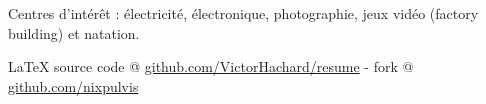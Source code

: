 \documentclass[10pt,a4paper]{article}
\newcommand{\latex}{\LaTeX\xspace}
\newenvironment{indentsection}[1]
{\begin{list}{}
  {\setlength{\leftmargin}{#1}} \item[]
}
{\end{list}}
\begin{document}
\begin{indentsection}{\parindent}
\begin{description*}
\item[Centres d'intérêt :]
  électricité, électronique, photographie, jeux vidéo (factory building) et natation.
\end{description*}
\end{indentsection}


\begin{center}
\footnotesize \latex source code @
\href{http://www.github.com/VictorHachard/resume}
{github.com/VictorHachard/resume} - fork @
\href{http://www.github.com/nixpulvis}
{github.com/nixpulvis} \\
\end{center}
\end{document}
